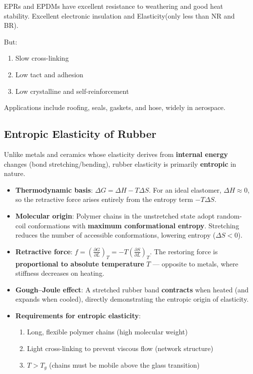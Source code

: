 \documentclass{NoteThesis/note-thesis}
\begin{document}
EPRs and EPDMs have excellent resistance to weathering and good heat stability. Excellent electronic insulation and Elasticity(only less than NR and BR).

But:

\begin{enumerate}
    \item Slow cross-linking
    \item Low tact and adhesion
    \item Low crystalline and self-reinforcement
\end{enumerate}

Applications include roofing, seals, gaskets, and hose, widely in aerospace.

\subsection{Entropic Elasticity of Rubber}

Unlike metals and ceramics whose elasticity derives from \textbf{internal energy} changes (bond stretching/bending), rubber elasticity is primarily \textbf{entropic} in nature.

\begin{itemize}
    \item \textbf{Thermodynamic basis}: $\Delta G = \Delta H - T\Delta S$. For an ideal elastomer, $\Delta H \approx 0$, so the retractive force arises entirely from the entropy term $-T\Delta S$.
    \item \textbf{Molecular origin}: Polymer chains in the unstretched state adopt random-coil conformations with \textbf{maximum conformational entropy}. Stretching reduces the number of accessible conformations, lowering entropy ($\Delta S < 0$).
    \item \textbf{Retractive force}: $f = \left( \frac{\partial G}{\partial L} \right)_T = -T \left( \frac{\partial S}{\partial L} \right)_T$. The restoring force is \textbf{proportional to absolute temperature} $T$ — opposite to metals, where stiffness decreases on heating.
    \item \textbf{Gough--Joule effect}: A stretched rubber band \textbf{contracts} when heated (and expands when cooled), directly demonstrating the entropic origin of elasticity.
    \item \textbf{Requirements for entropic elasticity}:
    \begin{enumerate}
        \item Long, flexible polymer chains (high molecular weight)
        \item Light cross-linking to prevent viscous flow (network structure)
        \item $T > T_g$ (chains must be mobile above the glass transition)
    \end{enumerate}
\end{itemize}
\end{document}
